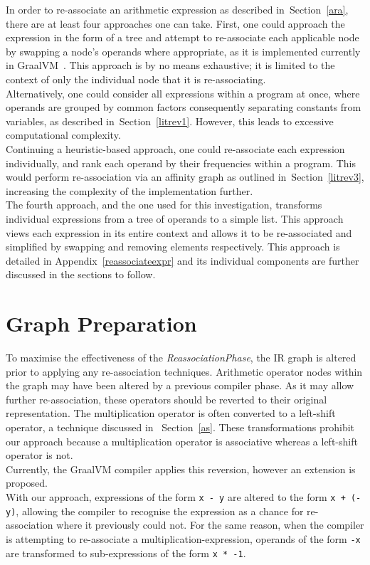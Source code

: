 \documentclass[12pt,openany,a4paper]{book}
\newcommand{\secn}[1] {Section~\ref{#1}}	%
\newcommand{\app}[1]  {Appendix~\ref{#1}}   %
\begin{document}
In order to re-associate an arithmetic expression as described in~\secn{ara},
there are at least four approaches one can take. First, one could approach the 
expression in the
form of a tree and attempt to re-associate each applicable node by swapping
a node's operands where appropriate, as it is implemented currently in GraalVM~\cite{graalenterprise}.
This approach is by no means exhaustive; it is limited to the context of only
the individual node that it is re-associating. \\
Alternatively, one could consider all expressions within a program at once,
where operands are grouped by common factors consequently separating constants from variables,
as described in~\secn{litrev1}. However, this leads to excessive computational complexity. \\
Continuing a heuristic-based approach, one could re-associate each expression individually,
and rank each operand by their frequencies within a program. This would perform
re-association via an affinity graph as outlined in~\secn{litrev3}, increasing the
complexity of the implementation further. \\
The fourth approach, and the one used for this investigation, transforms
individual expressions from a tree of operands to a simple list. This approach
views each expression in its entire context and allows it to be re-associated 
and simplified by swapping and removing elements respectively. This approach
is detailed in \app{reassociateexpr} and its individual components are
further discussed in the sections to follow.

\section{Graph Preparation}
\label{preparegraph}

To maximise the effectiveness of the \emph{ReassociationPhase},
the IR graph is altered prior to applying any re-association techniques.
Arithmetic operator nodes within the graph may have been altered by a previous
compiler phase. As it may allow further re-association, these operators
should be reverted to their original representation. The multiplication operator 
is often converted
to a left-shift operator, a technique discussed in ~\secn{as}. These
transformations prohibit our approach because a multiplication operator is 
associative whereas a left-shift operator is not. \\
Currently, the GraalVM compiler applies this reversion, however an extension
is proposed. \\
With our approach, expressions of the form \verb|x - y| are altered to the
form \verb|x + (-y)|, allowing the compiler to recognise the expression
as a chance for re-association where it previously could not. For the same
reason, when the compiler is attempting to re-associate a multiplication-expression,
operands of the form \verb|-x| are transformed to sub-expressions of the form
\verb|x * -1|. \\
\end{document}
